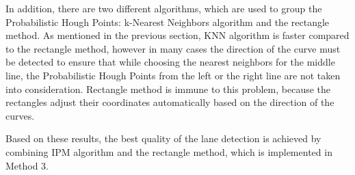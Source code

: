 In addition, there are two different algorithms, which are used to group the Probabilistic Hough Points: k-Nearest Neighbors algorithm and the rectangle method. As mentioned in the previous section, KNN algorithm is faster compared to the rectangle method, however in many cases the direction of the curve must be detected to ensure that while choosing the nearest neighbors for the middle line, the Probabilistic Hough Points from the left or the right line are not taken into consideration. Rectangle method is immune to this problem, because the rectangles adjust their coordinates automatically based on the direction of the curves.

Based on these results, the best quality of the lane detection is  achieved by combining IPM algorithm and the rectangle method, which is implemented in Method 3.

